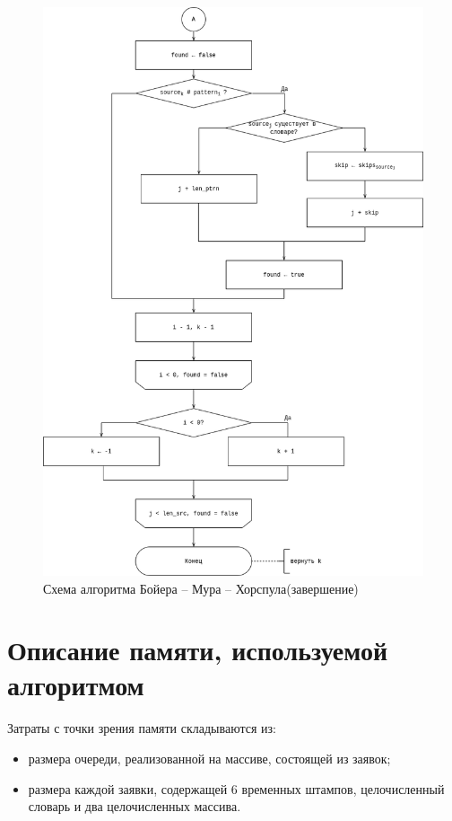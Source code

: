 \begin{center}
	\begin{figure}[H]
		\centering
		\includegraphics[width=0.85\linewidth]{assets/bmh_pipe-bmh-search-end.drawio.png}
		\caption{Схема алгоритма  Бойера -- Мура -- Хорспула(завершение)}
		\label{fig:bmh-end}
	\end{figure}
\end{center}

\section{Описание памяти, используемой алгоритмом}
Затраты с точки зрения памяти складываются из:
\begin{itemize}
	\item размера очереди, реализованной на массиве, состоящей из заявок;
	\item размера каждой заявки, содержащей 6 временных штампов, целочисленный словарь и два целочисленных массива. 
\end{itemize}


